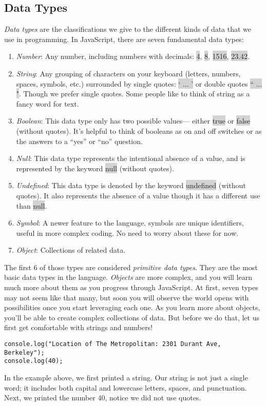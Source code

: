 \documentclass[11pt]{article}
\begin{document}
\subsection{Data Types}
\textit{Data types} are the classifications we give to the different kinds of data that we use in programming. In JavaScript, there are seven fundamental data types:
\begin{enumerate}[leftmargin = *]
\item \textit{Number}: Any number, including numbers with decimals: \colorbox{lightgray}{4}, \colorbox{lightgray}{8}, \colorbox{lightgray}{1516}, \colorbox{lightgray}{23.42}.
\item \textit{String}: Any grouping of characters on your keyboard (letters, numbers, spaces, symbols, etc.) surrounded by single quotes: \colorbox{lightgray}{` ... '} or double quotes \colorbox{lightgray}{`` ... "}. Though we prefer single quotes. Some people like to think of string as a fancy word for text. 
\item \textit{Boolean}: This data type only has two possible values— either \colorbox{lightgray}{true} or \colorbox{lightgray}{false} (without quotes). It’s helpful to think of booleans as on and off switches or as the answers to a “yes” or “no” question. 
\item \textit{Null}: This data type represents the intentional absence of a value, and is represented by the keyword \colorbox{lightgray}{null} (without quotes).
\item \textit{Undefined}: This data type is denoted by the keyword \colorbox{lightgray}{undefined} (without quotes). It also represents the absence of a value though it has a different use than \colorbox{lightgray}{null}.
\item \textit{Symbol}: A newer feature to the language, symbols are unique identifiers, useful in more complex coding. No need to worry about these for now.
\item \textit{Object}: Collections of related data.
\end{enumerate}
The first 6 of those types are considered \textit{primitive data types}. They are the most basic data types in the language. \textit{Objects} are more complex, and you will learn much more about them as you progress through JavaScript. At first, seven types may not seem like that many, but soon you will observe the world opens with possibilities once you start leveraging each one. As you learn more about objects, you’ll be able to create complex collections of data. But before we do that, let us first get comfortable with strings and numbers!
\begin{lstlisting}
console.log("Location of The Metropolitan: 2301 Durant Ave, Berkeley");
console.log(40);
\end{lstlisting}
In the example above, we first printed a string. Our string is not just a single word; it includes both capital and lowercase letters, spaces, and punctuation. Next, we printed the number 40, notice we did not use quotes.
\end{document}
